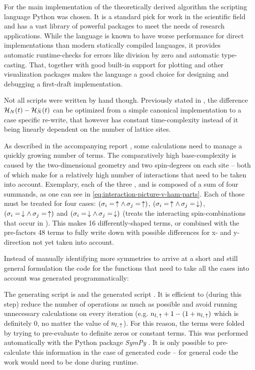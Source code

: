For the main implementation of the theoretically derived algorithm the scripting language Python was chosen.
It is a standard pick for work in the scientific field and has a vast library of powerful packages to meet the needs of research applications.
While the language is known to have worse performance for direct implementations than modern statically compiled languages, it provides automatic runtime-checks for errors like division by zero and automatic type-casting.
That, together with good built-in support for plotting and other visualization packages makes the language a good choice for designing and debugging a first-draft implementation.

Not all scripts were written by hand though.
Previously stated in , the difference $\HNOft - \HNOft[\vphantom{N}\smash{\tilde{N}}]$ can be optimized from a simple canonical implementation to a case specific re-write, that however has constant time-complexity instead of it being linearly dependent on the number of lattice sites.

As described in the accompanying report , some calculations need to manage a quickly growing number of terms.
The comparatively high base-complexity is caused by the two-dimensional geometry and two spin-degrees on each site -- both of which make for a relatively high number of interactions that need to be taken into account.
Exemplary, each of the three ,  and  is composed of a sum of four summands, as one can see in \autoref{eq:interaction-picture-v-ham-parts}.
Each of those must be treated for four cases: $(\sigma_i = \,\uparrow \land \,\sigma_j = \,\uparrow)$, $(\sigma_i = \,\uparrow \land \,\sigma_j = \,\downarrow)$, $(\sigma_i = \,\downarrow \land \,\sigma_j = \,\uparrow)$ and $(\sigma_i = \,\downarrow \land \,\sigma_j = \,\downarrow)$ (treats the interacting spin-combinations that occur in ).
This makes 16 differently-shaped terms, or combined with the pre-factors 48 terms to fully write down with possible differences for x- and y-direction not yet taken into account.

Instead of manually identifying more symmetries to arrive at a short and still general formulation the code for the functions that need to take all the cases into account was generated programmatically:

The generating script is  and the generated script .
It is efficient to (during this step) reduce the number of operations as much as possible and avoid running unnecessary calculations on every iteration (e.g. $n_{l,\,\uparrow} + 1 - (1 + n_{l,\,\uparrow})$ which is definitely 0, no matter the value of $n_{l,\,\uparrow}$).
For this reason, the terms were folded by trying to pre-evaluate to definite zeros or constant terms.
This was performed automatically with the Python package \emph{SymPy} \cite{sympyPackage}.
It is only possible to pre-calculate this information in the case of generated code -- for general code the work would need to be done during runtime.
